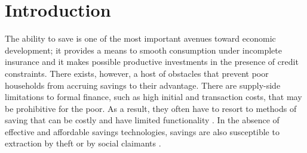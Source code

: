 \documentclass[11pt]{article}
\begin{document}
\newpage

\section{Introduction}






	The ability to save is one of the most important avenues toward economic development; it provides a means to smooth consumption under incomplete insurance and it makes possible productive investments in the presence of credit constraints. There exists, however, a host of obstacles that prevent poor households from accruing savings to their advantage. There are supply-side limitations to formal finance, such as high initial and transaction costs, that may be prohibitive for the poor. As a result, they often have to resort to methods of saving that can be costly and have limited functionality \parencite{collins_portfolios_2009,karlan_savings_2014}. In the absence of effective and affordable savings technologies, savings are also susceptible to extraction by theft or by social claimants \parencite{banerjee_economic_2007,schaner_cost_2011}.
\end{document}

